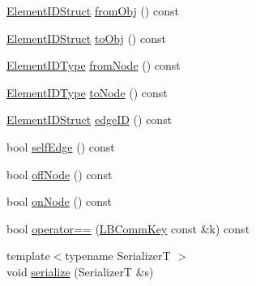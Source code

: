 \begin{DoxyCompactItemize}
\item 
\hyperlink{structvt_1_1vrt_1_1collection_1_1balance_1_1_element_i_d_struct}{Element\+I\+D\+Struct} \hyperlink{structvt_1_1vrt_1_1collection_1_1balance_1_1_l_b_comm_key_ad2bd1bdd8d499617f77c0c1a41d58bbc}{from\+Obj} () const
\item 
\hyperlink{structvt_1_1vrt_1_1collection_1_1balance_1_1_element_i_d_struct}{Element\+I\+D\+Struct} \hyperlink{structvt_1_1vrt_1_1collection_1_1balance_1_1_l_b_comm_key_a01cbb0279cde516c67317e5475e5a4c2}{to\+Obj} () const
\item 
\hyperlink{namespacevt_1_1vrt_1_1collection_1_1balance_a14c8d2c972f2913aa3f1636e5be0a120}{Element\+I\+D\+Type} \hyperlink{structvt_1_1vrt_1_1collection_1_1balance_1_1_l_b_comm_key_ae4d718ec81cafb4e830c5c9785baf070}{from\+Node} () const
\item 
\hyperlink{namespacevt_1_1vrt_1_1collection_1_1balance_a14c8d2c972f2913aa3f1636e5be0a120}{Element\+I\+D\+Type} \hyperlink{structvt_1_1vrt_1_1collection_1_1balance_1_1_l_b_comm_key_a159cf93a19b8a3fad2e4cfee94f96c83}{to\+Node} () const
\item 
\hyperlink{structvt_1_1vrt_1_1collection_1_1balance_1_1_element_i_d_struct}{Element\+I\+D\+Struct} \hyperlink{structvt_1_1vrt_1_1collection_1_1balance_1_1_l_b_comm_key_a7ecfe5b6fddf1556eefcd00772357d84}{edge\+ID} () const
\item 
bool \hyperlink{structvt_1_1vrt_1_1collection_1_1balance_1_1_l_b_comm_key_aa1fd1503a2c6d034bf329a1af7ca911a}{self\+Edge} () const
\item 
bool \hyperlink{structvt_1_1vrt_1_1collection_1_1balance_1_1_l_b_comm_key_a77c270338ac89fa8f31457f0b22f1230}{off\+Node} () const
\item 
bool \hyperlink{structvt_1_1vrt_1_1collection_1_1balance_1_1_l_b_comm_key_a6936fbd32052c703881774a5bdc4eec0}{on\+Node} () const
\item 
bool \hyperlink{structvt_1_1vrt_1_1collection_1_1balance_1_1_l_b_comm_key_ad3842428c1eb7648a07e5840c4d5b6c8}{operator==} (\hyperlink{structvt_1_1vrt_1_1collection_1_1balance_1_1_l_b_comm_key}{L\+B\+Comm\+Key} const \&k) const
\item 
{\footnotesize template$<$typename SerializerT $>$ }\\void \hyperlink{structvt_1_1vrt_1_1collection_1_1balance_1_1_l_b_comm_key_ac13d086d419525440a940292fa616d8c}{serialize} (SerializerT \&s)
\end{DoxyCompactItemize}
